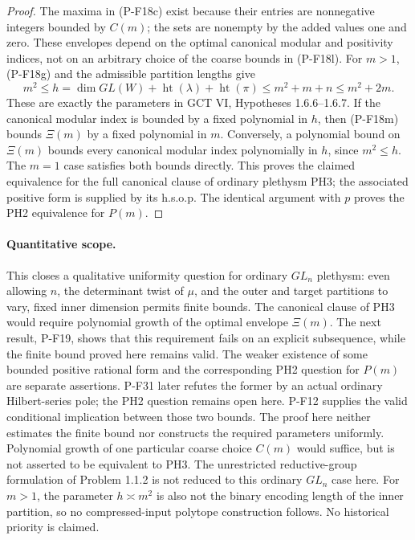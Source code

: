 \begin{proof}
The maxima in (P-F18c) exist because their entries are nonnegative
integers bounded by $C(m)$; the sets are nonempty by the added
values one and zero. These envelopes depend on the optimal
canonical modular and positivity indices, not on an arbitrary
choice of the coarse bounds in (P-F18l).
For $m>1$, (P-F18g) and the admissible partition lengths give
\[
 m^2\le
 h=\dim GL(W)+\operatorname{ht}(\lambda)+\operatorname{ht}(\pi)
 \le m^2+m+n\le m^2+2m.
 \tag{P-F18m}
\]
These are exactly the parameters in GCT VI, Hypotheses 1.6.6--1.6.7.
If the canonical modular index is bounded by a fixed polynomial in
$h$, then (P-F18m) bounds $\Xi(m)$ by a fixed polynomial in $m$.
Conversely, a polynomial bound on $\Xi(m)$ bounds every canonical
modular index polynomially in $h$, since $m^2\le h$.
The $m=1$ case satisfies both bounds directly. This proves the
claimed equivalence for the full canonical clause of ordinary
plethysm PH3; the associated positive form is supplied by its
h.s.o.p. The identical argument with $p$ proves the PH2 equivalence
for $P(m)$.
\end{proof}

\paragraph{Quantitative scope.}
This closes a qualitative uniformity question for ordinary
$GL_n$ plethysm: even allowing $n$, the determinant twist of $\mu$,
and the outer and target partitions to vary, fixed inner dimension
permits finite bounds. The canonical clause of PH3 would require
polynomial growth of the optimal envelope $\Xi(m)$. The next
result, P-F19, shows that this requirement fails on an explicit
subsequence, while the finite bound proved here remains valid.
The weaker existence of some bounded positive rational form and the
corresponding PH2 question for $P(m)$ are separate assertions.
P-F31 later refutes the former by an actual ordinary Hilbert-series
pole; the PH2 question remains open here. P-F12 supplies the valid
conditional implication between those two bounds.
The proof here neither estimates the finite bound nor constructs
the required parameters uniformly. Polynomial growth of one particular coarse choice
$C(m)$ would suffice, but is not asserted to be equivalent to PH3.
The unrestricted reductive-group formulation of Problem 1.1.2 is
not reduced to this ordinary $GL_n$ case here. For $m>1$, the parameter
$h\asymp m^2$ is also not the binary encoding length of the inner
partition, so no compressed-input polytope construction follows.
No historical priority is claimed.
